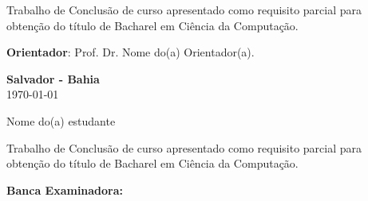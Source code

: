 \documentclass[12pt, a4paper]{report}
\begin{document}
\vspace{4cm}

\begin{flushright}
\begin{minipage}{8.6cm}
Trabalho de Conclusão de curso apresentado como 
requisito parcial para obtenção 
do título de Bacharel em Ciência da Computação.

\vspace{0.5cm}
\textbf{Orientador}: Prof. Dr. Nome do(a) Orientador(a).

\end{minipage}
\end{flushright}
 
\vspace{8cm}


\begin{center}
\textbf{Salvador - Bahia} \\
\today
\end{center}


\newpage
\begin{center}

\vspace{2.2cm}

\large{Nome do(a) estudante}
\end{center}

\vspace{2.2cm}

\begin{flushright}
\begin{minipage}{8.6cm} 
Trabalho de Conclusão de curso apresentado como 
requisito parcial para obtenção 
do título de Bacharel em Ciência da Computação.
\end{minipage}
\end{flushright}
 
\vspace{1cm}
\begin{center}
\Large \textbf{Banca Examinadora:}
\end{center}
\vspace{1.5cm}
\end{document}
